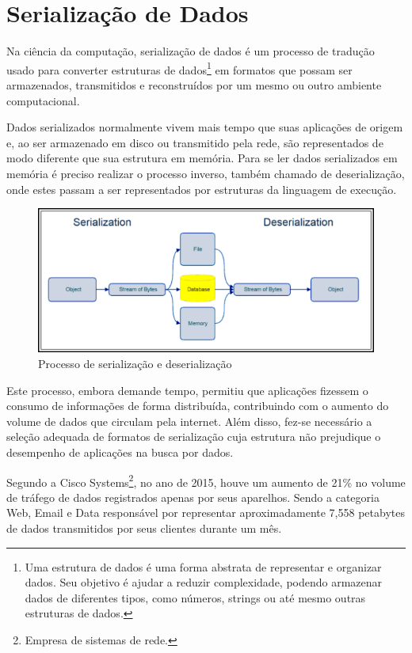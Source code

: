 \section[Serialização de Dados]{Serialização de Dados}

Na ciência da computação, serialização de dados é um processo de tradução usado para converter estruturas de dados\footnote{
  Uma estrutura de dados é uma forma abstrata de representar e organizar dados. Seu objetivo é ajudar a reduzir complexidade, podendo armazenar dados de diferentes tipos, como números, strings ou até mesmo outras estruturas de dados.
} em formatos que possam ser armazenados, transmitidos e reconstruídos por um mesmo ou outro ambiente computacional. \cite{Cline2016}

Dados serializados normalmente vivem mais tempo que suas aplicações de origem e, ao ser armazenado em disco ou transmitido pela rede, são representados de modo diferente que sua estrutura em memória. Para se ler dados serializados em memória é preciso realizar o processo inverso, também chamado de deserialização, onde estes passam a ser representados por estruturas da linguagem de execução. \cite{Guller2016}

\begin{figure}[h]
  \centering
  \includegraphics[width=\textwidth,height=\textheight,keepaspectratio]{figuras/data-serialization-deserialization.png}
  \caption{Processo de serialização e deserialização}
\end{figure}

Este processo, embora demande tempo, permitiu que aplicações fizessem o consumo de informações de forma distribuída, contribuindo com o aumento do volume de dados que circulam pela internet. Além disso, fez-se necessário a seleção adequada de formatos de serialização cuja estrutura não prejudique o desempenho de aplicações na busca por dados. \cite{SumarayMakki2012}

Segundo a Cisco Systems\footnote{
  Empresa de sistemas de rede.
}, no ano de 2015, houve um aumento de 21\% no volume de tráfego de dados registrados apenas por seus aparelhos. Sendo a categoria Web, Email e Data responsável por representar aproximadamente 7,558 petabytes de dados transmitidos por seus clientes durante um mês. \cite{Cisco2016}

